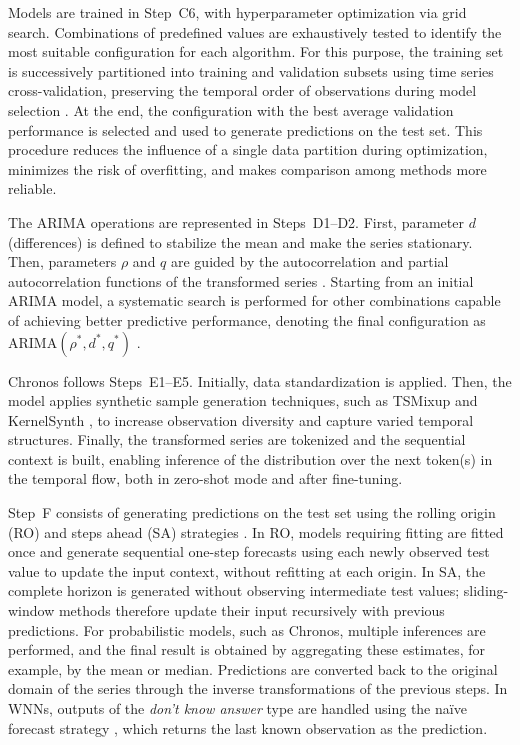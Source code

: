 \documentclass[final,3p,times,twocolumn,authoryear]{elsarticle}
\begin{document}
Models are trained in Step~C6, with hyperparameter optimization via grid search. Combinations of predefined values are exhaustively tested to identify the most suitable configuration for each algorithm. For this purpose, the training set is successively partitioned into training and validation subsets using time series cross-validation, preserving the temporal order of observations during model selection \citep{hyndman_forecasting_2021}. At the end, the configuration with the best average validation performance is selected and used to generate predictions on the test set. This procedure reduces the influence of a single data partition during optimization, minimizes the risk of overfitting, and makes comparison among methods more reliable.

The ARIMA operations are represented in Steps~D1--D2. First, parameter $d$ (differences) is defined to stabilize the mean and make the series stationary. Then, parameters $\rho$ and $q$ are guided by the autocorrelation and partial autocorrelation functions of the transformed series \citep{kontopoulou_areview_2023}. Starting from an initial ARIMA model, a systematic search is performed for other combinations capable of achieving better predictive performance, denoting the final configuration as $\text{ARIMA}(\rho^*,d^*,q^*)$ \citep{hyndman_automatic_2008}.

Chronos follows Steps~E1--E5. Initially, data standardization is applied. Then, the model applies synthetic sample generation techniques, such as TSMixup and KernelSynth \citep{ansari_chronos_2024}, to increase observation diversity and capture varied temporal structures. Finally, the transformed series are tokenized and the sequential context is built, enabling inference of the distribution over the next token(s) in the temporal flow, both in zero-shot mode and after fine-tuning.

Step~F consists of generating predictions on the test set using the rolling origin (RO) and steps ahead (SA) strategies \citep{hyndman_forecasting_2021}. In RO, models requiring fitting are fitted once and generate sequential one-step forecasts using each newly observed test value to update the input context, without refitting at each origin. In SA, the complete horizon is generated without observing intermediate test values; sliding-window methods therefore update their input recursively with previous predictions. For probabilistic models, such as Chronos, multiple inferences are performed, and the final result is obtained by aggregating these estimates, for example, by the mean or median. Predictions are converted back to the original domain of the series through the inverse transformations of the previous steps. In WNNs, outputs of the \textit{don't know answer} type are handled using the naïve forecast strategy \citep{hyndman_forecasting_2021}, which returns the last known observation as the prediction.
\end{document}
